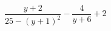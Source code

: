 \begin{ex}[type=expression]
	\begin{condition}
		\(\dfrac{y+2}{25-(y+1)^2}-\dfrac{4}{y+6}+2\)
	\end{condition}
\end{ex}